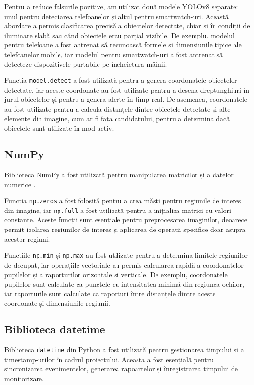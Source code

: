 \documentclass[12pt,a4paper]{article}
\begin{document}
Pentru a reduce falsurile pozitive, am utilizat două modele YOLOv8 separate: unul pentru detectarea telefoanelor și altul pentru smartwatch-uri. Această abordare a permis clasificarea precisă a obiectelor detectate, chiar și în condiții de iluminare slabă sau când obiectele erau parțial vizibile. De exemplu, modelul pentru telefoane a fost antrenat să recunoască formele și dimensiunile tipice ale telefoanelor mobile, iar modelul pentru smartwatch-uri a fost antrenat să detecteze dispozitivele purtabile pe încheietura mâinii.

Funcția \texttt{model.detect} a fost utilizată pentru a genera coordonatele obiectelor detectate, iar aceste coordonate au fost utilizate pentru a desena dreptunghiuri în jurul obiectelor și pentru a genera alerte în timp real. De asemenea, coordonatele au fost utilizate pentru a calcula distanțele dintre obiectele detectate și alte elemente din imagine, cum ar fi fața candidatului, pentru a determina dacă obiectele sunt utilizate în mod activ.

\subsection{NumPy}
Biblioteca NumPy a fost utilizată pentru manipularea matricilor și a datelor numerice \cite{numpy}. 

Funcția \texttt{np.zeros} a fost folosită pentru a crea măști pentru regiunile de interes din imagine, iar \texttt{np.full} a fost utilizată pentru a inițializa matrici cu valori constante. Aceste funcții sunt esențiale pentru preprocesarea imaginilor, deoarece permit izolarea regiunilor de interes și aplicarea de operații specifice doar asupra acestor regiuni.

Funcțiile \texttt{np.min} și \texttt{np.max} au fost utilizate pentru a determina limitele regiunilor de decupat, iar operațiile vectoriale au permis calcularea rapidă a coordonatelor pupilelor și a raporturilor orizontale și verticale. De exemplu, coordonatele pupilelor sunt calculate ca punctele cu intensitatea minimă din regiunea ochilor, iar raporturile sunt calculate ca raporturi între distanțele dintre aceste coordonate și dimensiunile regiunii.

\subsection{Biblioteca datetime}
Biblioteca \texttt{datetime}\cite{datetime} din Python a fost utilizată pentru gestionarea timpului și a timestamp-urilor în cadrul proiectului. Aceasta a fost esențială pentru sincronizarea evenimentelor, generarea rapoartelor și înregistrarea timpului de monitorizare.
\end{document}
